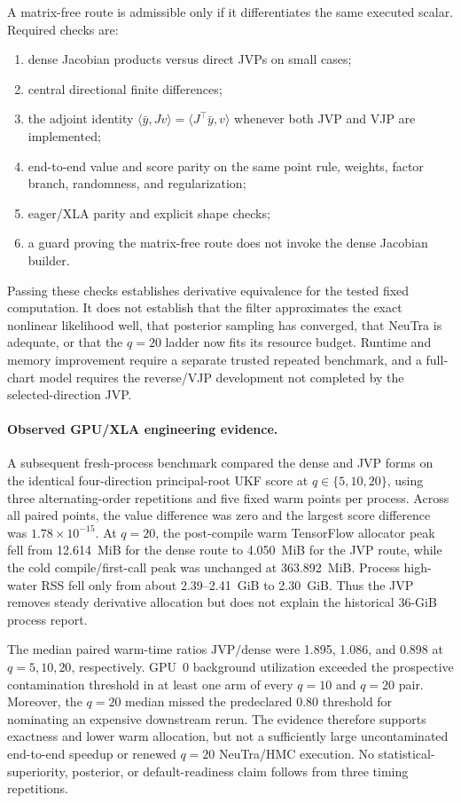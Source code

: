 A matrix-free route is admissible only if it differentiates the same executed
scalar.  Required checks are:
\begin{enumerate}[label=(\arabic*)]
  \item dense Jacobian products versus direct JVPs on small cases;
  \item central directional finite differences;
  \item the adjoint identity
  $\langle\bar y,Jv\rangle=\langle J^\top\bar y,v\rangle$ whenever both JVP
  and VJP are implemented;
  \item end-to-end value and score parity on the same point rule, weights,
  factor branch, randomness, and regularization;
  \item eager/XLA parity and explicit shape checks;
  \item a guard proving the matrix-free route does not invoke the dense
  Jacobian builder.
\end{enumerate}
Passing these checks establishes derivative equivalence for the tested fixed
computation.  It does not establish that the filter approximates the exact
nonlinear likelihood well, that posterior sampling has converged, that NeuTra
is adequate, or that the $q=20$ ladder now fits its resource budget.  Runtime
and memory improvement require a separate trusted repeated benchmark, and a
full-chart model requires the reverse/VJP development not completed by the
selected-direction JVP.

\paragraph{Observed GPU/XLA engineering evidence.}
A subsequent fresh-process benchmark compared the dense and JVP forms on the
identical four-direction principal-root UKF score at $q\in\{5,10,20\}$, using
three alternating-order repetitions and five fixed warm points per process.
Across all paired points, the value difference was zero and the largest score
difference was $1.78\times10^{-15}$.  At $q=20$, the post-compile warm
TensorFlow allocator peak fell from 12.614~MiB for the dense route to
4.050~MiB for the JVP route, while the cold compile/first-call peak was
unchanged at 363.892~MiB.  Process high-water RSS fell only from about
2.39--2.41~GiB to 2.30~GiB.  Thus the JVP removes steady derivative allocation
but does not explain the historical 36-GiB process report.

The median paired warm-time ratios $\mathrm{JVP}/\mathrm{dense}$ were 1.895,
1.086, and 0.898 at $q=5,10,20$, respectively.  GPU~0 background utilization
exceeded the prospective contamination threshold in at least one arm of every
$q=10$ and $q=20$ pair.  Moreover, the $q=20$ median missed the predeclared
0.80 threshold for nominating an expensive downstream rerun.  The evidence
therefore supports exactness and lower warm allocation, but not a sufficiently
large uncontaminated end-to-end speedup or renewed $q=20$ NeuTra/HMC execution.
No statistical-superiority, posterior, or default-readiness claim follows from
three timing repetitions.

